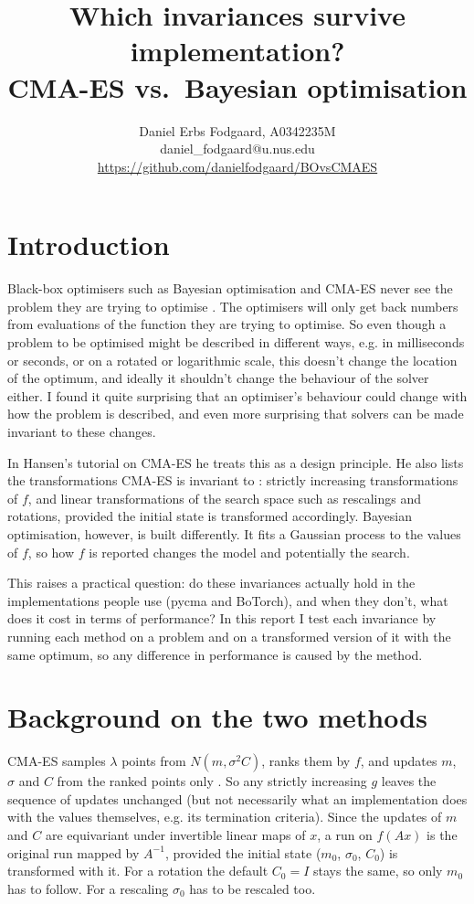 \documentclass[12pt,a4paper]{article}
\title{Which invariances survive implementation? \\ CMA-ES vs.\ Bayesian optimisation}
\author{Daniel Erbs Fodgaard, A0342235M \\ daniel\_fodgaard@u.nus.edu \\ \url{https://github.com/danielfodgaard/BOvsCMAES}}
\date{\vspace{-2.5em}}
\begin{document}
\maketitle

\section{Introduction}

Black-box optimisers such as Bayesian optimisation and CMA-ES never see the problem they are trying to optimise \cite{frazier2018, hansen2016}. The optimisers will only get back numbers from evaluations of the function they are trying to optimise. So even though a problem to be optimised might be described in different ways, e.g. in milliseconds or seconds, or on a rotated or logarithmic scale, this doesn't change the location of the optimum, and ideally it shouldn't change the behaviour of the solver either. I found it quite surprising that an optimiser's behaviour could change with how the problem is described, and even more surprising that solvers can be made invariant to these changes.

In Hansen's tutorial on CMA-ES he treats this as a design principle. He also lists the transformations CMA-ES is invariant to \cite{hansen2016}: strictly increasing transformations of \(f\), and linear transformations of the search space such as rescalings and rotations, provided the initial state is transformed accordingly. Bayesian optimisation, however, is built differently. It fits a Gaussian process to the values of \(f\), so how \(f\) is reported changes the model and potentially the search.

This raises a practical question: do these invariances actually hold in the implementations people use (pycma and BoTorch), and when they don't, what does it cost in terms of performance? In this report I test each invariance by running each method on a problem and on a transformed version of it with the same optimum, so any difference in performance is caused by the method.

\section{Background on the two methods}

CMA-ES samples \(\lambda\) points from \(N\left( m,\sigma^{2}C \right)\), ranks them by \(f\), and updates \(m\), \(\sigma\) and \(C\) from the ranked points only \cite{hansen2016}. So any strictly increasing \(g\) leaves the sequence of updates unchanged (but not necessarily what an implementation does with the values themselves, e.g. its termination criteria). Since the updates of \(m\) and \(C\) are equivariant under invertible linear maps of \(x\), a run on \(f(Ax)\) is the original run mapped by \(A^{- 1}\), provided the initial state (\(m_{0}\), \(\sigma_{0}\), \(C_{0}\)) is transformed with it. For a rotation the default \(C_{0} = I\) stays the same, so only \(m_{0}\) has to follow. For a rescaling \(\sigma_{0}\) has to be rescaled too.
\end{document}
